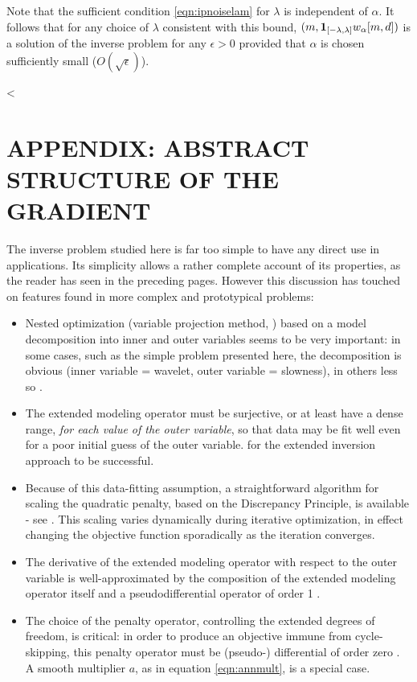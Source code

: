  Note that the sufficient condition \ref{eqn:ipnoiselam} for
$\lambda$ is independent of $\alpha$. It follows that for any choice
of $\lambda$ consistent with this bound, $(m,{\bf
  1}_{[-\lambda,\lambda]}w_{\alpha}[m,d])$ is a solution of the inverse
problem for any $\epsilon > 0$ provided that $\alpha$ is chosen
sufficiently small ($O(\sqrt{\epsilon})$).



<

%

\section*{APPENDIX: ABSTRACT STRUCTURE OF THE GRADIENT}

The inverse problem studied here is far too simple to have any direct
use in applications. Its simplicity allows a rather complete account of
its properties, as the reader has seen in the preceding pages. However
this discussion has touched on features found in more complex and
prototypical problems:
\begin{itemize}
\item Nested optimization (variable projection method,
  \cite{GolubPereyra:03}) based on a model decomposition into inner
  and outer variables seems to be very important: in some cases, such
  as the simple problem presented here, the decomposition is obvious
  (inner variable = wavelet, outer variable = slowness), in others
  less so \cite[]{geoprosp:2008,Terentyev:thesis}.
\item The extended modeling operator must be surjective, or at least
  have a dense range, {\em for each value of the outer variable}, so
  that data may be fit well even for a poor initial guess of the outer
  variable. for the extended inversion approach to be successful.
\item Because of this data-fitting assumption, a straightforward
  algorithm for scaling the quadratic penalty, based on the
  Discrepancy Principle, is available - see
  \cite{FuSymes2017discrepancy,SymesChenMinkoff:21}. This
  scaling varies dynamically during iterative optimization, in effect
  changing the objective function sporadically as the iteration
  converges.
\item The derivative of the extended modeling operator with respect to
  the outer variable is well-approximated by the composition of the
  extended modeling operator itself and a pseudodifferential operator
  of order 1 \cite[]{Symes:IPTA14,tenKroode:IPTA14}.
\item The choice of the penalty operator, controlling the extended
  degrees of freedom, is critical: in order to produce an objective
  immune from cycle-skipping, this penalty operator must be
  (pseudo-) differential of order zero \cite[]{StolkSymes:03}. A smooth
  multiplier $a$, as in equation \ref{eqn:annmult}, is a special case.
\end{itemize}

